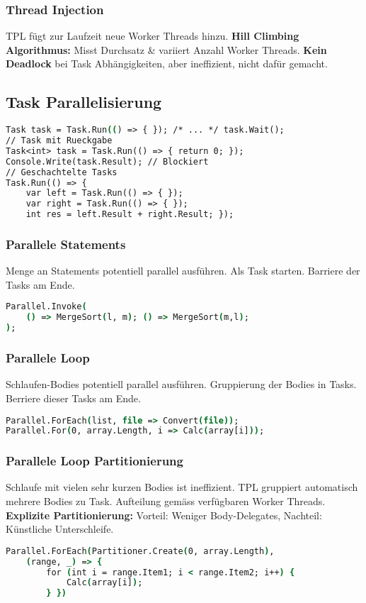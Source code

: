 \subsubsection{Thread Injection}
TPL fügt zur Laufzeit neue Worker Threads hinzu.
\textbf{Hill Climbing Algorithmus:} Misst Durchsatz \& variiert Anzahl Worker Threads.
\textbf{Kein Deadlock} bei Task Abhängigkeiten, aber ineffizient, nicht dafür gemacht.

\subsection{Task Parallelisierung}
\begin{lstlisting}[language=csh]
Task task = Task.Run(() => { }); /* ... */ task.Wait();
// Task mit Rueckgabe 
Task<int> task = Task.Run(() => { return 0; });
Console.Write(task.Result); // Blockiert 
// Geschachtelte Tasks
Task.Run(() => {
    var left = Task.Run(() => { }); 
    var right = Task.Run(() => { });
    int res = left.Result + right.Result; });
\end{lstlisting}

\subsubsection{Parallele Statements}
Menge an Statements potentiell parallel ausführen. Als Task starten. Barriere der Tasks am Ende.
\begin{lstlisting}[language=csh]
Parallel.Invoke(
    () => MergeSort(l, m); () => MergeSort(m,l);
);
\end{lstlisting}

\subsubsection{Parallele Loop}
Schlaufen-Bodies potentiell parallel ausführen.
Gruppierung der Bodies in Tasks.
Berriere dieser Tasks am Ende.
\begin{lstlisting}[language=csh]
Parallel.ForEach(list, file => Convert(file));
Parallel.For(0, array.Length, i => Calc(array[i]));
\end{lstlisting}

\subsubsection{Parallele Loop Partitionierung}
Schlaufe mit vielen sehr kurzen Bodies ist ineffizient.
TPL gruppiert automatisch mehrere Bodies zu Task.
Aufteilung gemäss verfügbaren Worker Threads.\\
\textbf{Explizite Partitionierung:} Vorteil: Weniger Body-Delegates, Nachteil: Künstliche Unterschleife.
\begin{lstlisting}[language=csh]
Parallel.ForEach(Partitioner.Create(0, array.Length), 
    (range, _) => {
        for (int i = range.Item1; i < range.Item2; i++) {
            Calc(array[i]);
        } })
\end{lstlisting}

